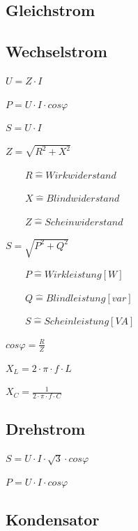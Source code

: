 \documentclass[12pt,a4paper]{article}
\begin{document}
\subsection{Gleichstrom}
\subsection{Wechselstrom}
\begin{description}
\item $U=Z \cdot I$
\item $P=U \cdot I \cdot cos \varphi$
\item $S=U \cdot I$
\item $Z=\sqrt{R^{2}+X^{2}}$
\item ~~~~$R \widehat{=} Wirkwiderstand$
\item ~~~~$X \widehat{=} Blindwiderstand$
\item ~~~~$Z \widehat{=} Scheinwiderstand$
\item $S=\sqrt{P^{2}+Q^{2}}$
\item ~~~~$P \widehat{=} Wirkleistung [W]$
\item ~~~~$Q \widehat{=} Blindleistung [var]$
\item ~~~~$S \widehat{=} Scheinleistung [VA]$
\item $cos \varphi = \frac{R}{Z}$
\item $X_{L} = 2 \cdot \pi \cdot f \cdot L$
\item $X_{C} = \frac{1}{2 \cdot \pi \cdot f \cdot C} $
\end{description}
\subsection{Drehstrom}
\begin{description}
\item $S = U \cdot I \cdot \sqrt{3} \cdot cos \varphi$
\item $P = U \cdot I \cdot cos \varphi$
\end{description}
\subsection{Kondensator}
\end{document}
